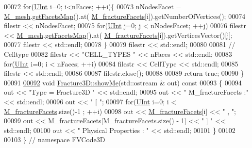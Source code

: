 \begin{DoxyCode}
00072     \textcolor{keywordflow}{for}(\hyperlink{namespaceFVCode3D_a4bf7e328c75d0fd504050d040ebe9eda}{UInt} i=0; i<nFaces; ++i)\{
00073         nNodesFacet = \hyperlink{classFVCode3D_1_1Fracture3D_ab3ceda8a7f2e67ee5d94a08be2ba2977}{M\_mesh}.\hyperlink{classFVCode3D_1_1Mesh3D_a76de387da2a552e3e1210d795bc7acf9}{getFacetsMap}().at(
      \hyperlink{classFVCode3D_1_1Fracture3D_ab2da921dc007666c4f9111b3204f0072}{M\_fractureFacets}[i]).getNumberOfVertices();
00074         filestr << nNodesFacet;
00075         \textcolor{keywordflow}{for}(\hyperlink{namespaceFVCode3D_a4bf7e328c75d0fd504050d040ebe9eda}{UInt} j=0; j < nNodesFacet; ++j)
00076             filestr << \hyperlink{classFVCode3D_1_1Fracture3D_ab3ceda8a7f2e67ee5d94a08be2ba2977}{M\_mesh}.\hyperlink{classFVCode3D_1_1Mesh3D_a76de387da2a552e3e1210d795bc7acf9}{getFacetsMap}().at(
      \hyperlink{classFVCode3D_1_1Fracture3D_ab2da921dc007666c4f9111b3204f0072}{M\_fractureFacets}[i]).getVerticesVector()[j];
00077         filestr << std::endl;
00078     \}
00079     filestr << std::endl;
00080 
00081     \textcolor{comment}{// Celltype}
00082     filestr << \textcolor{stringliteral}{"CELL\_TYPES "} << nFaces << std::endl;
00083     \textcolor{keywordflow}{for}(\hyperlink{namespaceFVCode3D_a4bf7e328c75d0fd504050d040ebe9eda}{UInt} i=0; i < nFaces; ++i)
00084         filestr << CellType << std::endl;
00085     filestr << std::endl;
00086 
00087     filestr.close();
00088 
00089     \textcolor{keywordflow}{return} \textcolor{keyword}{true};
00090 \}
00091 
\hypertarget{Fracture3D_8cpp_source.tex_l00092}{}\hyperlink{classFVCode3D_1_1Fracture3D_a35cf7c9104e494422e41a87faae74d65}{00092} \textcolor{keywordtype}{void} \hyperlink{classFVCode3D_1_1Fracture3D_a35cf7c9104e494422e41a87faae74d65}{Fracture3D::showMe}(std::ostream & out)\textcolor{keyword}{ const}
00093 \textcolor{keyword}{}\{
00094     out << \textcolor{stringliteral}{"Type = Fracture3D "} << std::endl;
00095     out << \textcolor{stringliteral}{" M\_fractureFacets :"} << std::endl;
00096     out << \textcolor{stringliteral}{" [ "};
00097     \textcolor{keywordflow}{for}(\hyperlink{namespaceFVCode3D_a4bf7e328c75d0fd504050d040ebe9eda}{UInt} i=0; i < \hyperlink{classFVCode3D_1_1Fracture3D_ab2da921dc007666c4f9111b3204f0072}{M\_fractureFacets}.size()-1 ; ++i)
00098         out << \hyperlink{classFVCode3D_1_1Fracture3D_ab2da921dc007666c4f9111b3204f0072}{M\_fractureFacets}[i] << \textcolor{stringliteral}{" , "};
00099     out << \hyperlink{classFVCode3D_1_1Fracture3D_ab2da921dc007666c4f9111b3204f0072}{M\_fractureFacets}[\hyperlink{classFVCode3D_1_1Fracture3D_ab2da921dc007666c4f9111b3204f0072}{M\_fractureFacets}.size() - 1] << \textcolor{stringliteral}{" ] "} << 
      std::endl;
00100     out << \textcolor{stringliteral}{" Physical Properties : "} << std::endl;
00101 \}
00102 
00103 \} \textcolor{comment}{// namespace FVCode3D}
\end{DoxyCode}
